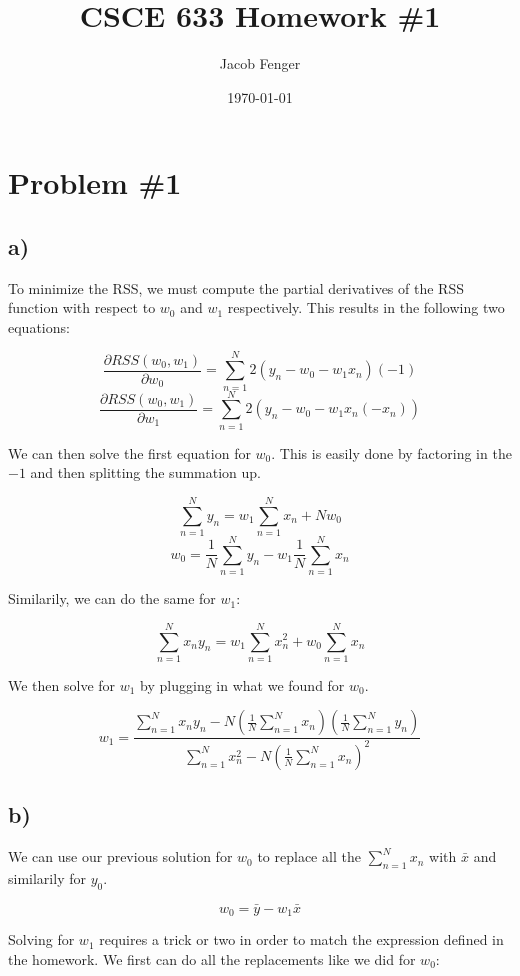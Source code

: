 \documentclass[12pt]{article}
\let\Oldsection\section
\renewcommand{\section}{\FloatBarrier\Oldsection}
\let\Oldsubsection\subsection
\renewcommand{\subsection}{\FloatBarrier\Oldsubsection}
\begin{document}
\title{CSCE 633 Homework \#1}
\author{Jacob Fenger}
\date{\today}
\maketitle

\section*{Problem \#1}
\subsection*{a)}
To minimize the RSS, we must compute the partial derivatives of the RSS
function with respect to $w_0$ and $w_1$ respectively. This results in the
following two equations:

$$ \frac{\partial RSS(w_0, w_1)}{\partial w_0} = \sum_{n=1}^{N} 2(y_n - w_0 - w_{1}x_{n})(-1) $$
$$ \frac{\partial RSS(w_0, w_1)}{\partial w_1} = \sum_{n=1}^{N} 2(y_n - w_0 - w_{1}x_{n}(-x_{n})) $$

We can then solve the first equation for $w_0$. This is easily done by factoring
in the $-1$ and then splitting the summation up.

$$ \sum_{n=1}^{N} y_n = w_1 \sum_{n=1}^{N} x_n + N w_0 $$
$$ w_0 = \frac{1}{N} \sum_{n=1}^{N} y_n - w_1 \frac{1}{N} \sum_{n=1}^{N} x_n $$

Similarily, we can do the same for $w_1$:

$$ \sum_{n=1}^{N} x_n y_n = w_1 \sum_{n=1}^{N} x_{n}^{2} + w_0 \sum_{n=1}^{N} x_n $$

We then solve for $w_1$ by plugging in what we found for $w_0$.


$$ w_1 = \frac{\sum_{n=1}^{N} x_n y_n - N (\frac{1}{N}\sum_{n=1}^{N} x_n)(\frac{1}{N}\sum_{n=1}^{N}y_n)}
		{\sum_{n=1}^{N} x_{n}^{2} - N (\frac{1}{N} \sum_{n=1}^{N} x_n)^{2}} $$

\subsection*{b)}

We can use our previous solution for $w_0$ to replace all the $\sum_{n=1}^{N} x_n$ with $\bar{x}$
and similarily for $y_0$.

$$ w_0 = \bar{y} - w_1 \bar{x} $$

Solving for $w_1$ requires a trick or two in order to match the expression 
defined in the homework. We first can do all the replacements like we did for $w_0$:
\end{document}
